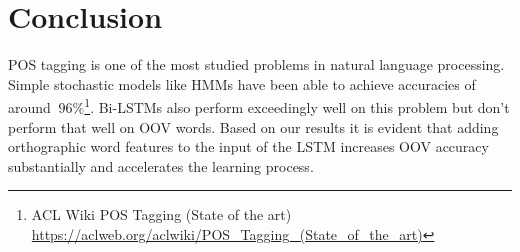 \documentclass[11pt,letterpaper]{article}
\begin{document}
\section{Conclusion}
POS tagging is one of the most studied problems in natural language processing. Simple stochastic models like HMMs have been able to achieve accuracies of around $~96\%$\footnote{ACL Wiki POS Tagging (State of the art) \url{https://aclweb.org/aclwiki/POS_Tagging_(State_of_the_art)}}. Bi-LSTMs also perform exceedingly well on this problem but don't perform that well on OOV words. Based on our results it is evident that adding orthographic word features to the input of the LSTM increases OOV accuracy substantially and accelerates the learning process. 
\end{document}
